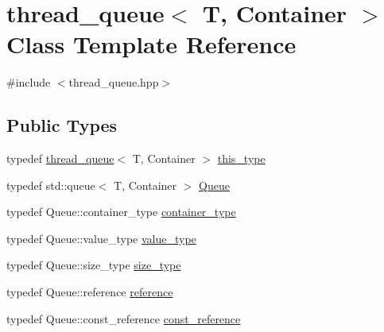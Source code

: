 \hypertarget{classyuh_1_1thread__queue}{\section{thread\-\_\-queue$<$ \-T, \-Container $>$ \-Class \-Template \-Reference}
\label{d2/d54/classyuh_1_1thread__queue}
}


{\ttfamily \#include $<$thread\-\_\-queue.\-hpp$>$}

\subsection*{\-Public \-Types}
\begin{DoxyCompactItemize}
\item 
typedef \hyperlink{classyuh_1_1thread__queue}{thread\-\_\-queue}$<$ \-T, \*
\-Container $>$ \hyperlink{classyuh_1_1thread__queue_a0b6cc122d5afe5dba8a2622add14ec45}{this\-\_\-type}
\item 
typedef std\-::queue$<$ \-T, \-Container $>$ \hyperlink{classyuh_1_1thread__queue_a7298798dd8d5df210bee3a306107bd43}{\-Queue}
\item 
typedef \-Queue\-::container\-\_\-type \hyperlink{classyuh_1_1thread__queue_a533ae1bede764ab6e544a525d66d6cea}{container\-\_\-type}
\item 
typedef \-Queue\-::value\-\_\-type \hyperlink{classyuh_1_1thread__queue_a6e0ae4bff8abfada948f8f378e5c701f}{value\-\_\-type}
\item 
typedef \-Queue\-::size\-\_\-type \hyperlink{classyuh_1_1thread__queue_a8e7cd930c132420fd043346d2357cc1a}{size\-\_\-type}
\item 
typedef \-Queue\-::reference \hyperlink{classyuh_1_1thread__queue_a2290230a4818fa015496b463bf8e4b0c}{reference}
\item 
typedef \-Queue\-::const\-\_\-reference \hyperlink{classyuh_1_1thread__queue_aa25405d259f1bdab8c36b1d9f5a444cc}{const\-\_\-reference}
\end{DoxyCompactItemize}
